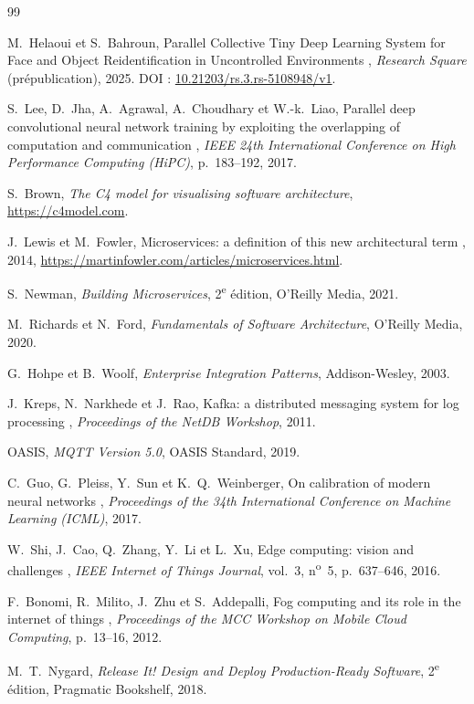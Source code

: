 \documentclass[11pt,a4paper]{report}
\begin{document}
\begin{thebibliography}{99}

M.~Helaoui et S.~Bahroun,
\og Parallel Collective Tiny Deep Learning System for Face and Object Reidentification in Uncontrolled Environments \fg,
\emph{Research Square} (prépublication), 2025.
DOI : \href{https://doi.org/10.21203/rs.3.rs-5108948/v1}{10.21203/rs.3.rs-5108948/v1}.

S.~Lee, D.~Jha, A.~Agrawal, A.~Choudhary et W.-k.~Liao,
\og Parallel deep convolutional neural network training by exploiting the overlapping of computation and communication \fg,
\emph{IEEE 24th International Conference on High Performance Computing (HiPC)}, p.~183--192, 2017.

S.~Brown,
\emph{The C4 model for visualising software architecture},
\url{https://c4model.com}.

J.~Lewis et M.~Fowler,
\og Microservices: a definition of this new architectural term \fg, 2014,
\url{https://martinfowler.com/articles/microservices.html}.

S.~Newman,
\emph{Building Microservices}, 2\textsuperscript{e} édition, O'Reilly Media, 2021.

M.~Richards et N.~Ford,
\emph{Fundamentals of Software Architecture}, O'Reilly Media, 2020.

G.~Hohpe et B.~Woolf,
\emph{Enterprise Integration Patterns}, Addison-Wesley, 2003.

J.~Kreps, N.~Narkhede et J.~Rao,
\og Kafka: a distributed messaging system for log processing \fg,
\emph{Proceedings of the NetDB Workshop}, 2011.

OASIS,
\emph{MQTT Version 5.0}, OASIS Standard, 2019.

C.~Guo, G.~Pleiss, Y.~Sun et K.~Q.~Weinberger,
\og On calibration of modern neural networks \fg,
\emph{Proceedings of the 34th International Conference on Machine Learning (ICML)}, 2017.

W.~Shi, J.~Cao, Q.~Zhang, Y.~Li et L.~Xu,
\og Edge computing: vision and challenges \fg,
\emph{IEEE Internet of Things Journal}, vol.~3, n\textsuperscript{o}~5, p.~637--646, 2016.

F.~Bonomi, R.~Milito, J.~Zhu et S.~Addepalli,
\og Fog computing and its role in the internet of things \fg,
\emph{Proceedings of the MCC Workshop on Mobile Cloud Computing}, p.~13--16, 2012.

M.~T.~Nygard,
\emph{Release It! Design and Deploy Production-Ready Software}, 2\textsuperscript{e} édition, Pragmatic Bookshelf, 2018.

\end{thebibliography}
\end{document}

